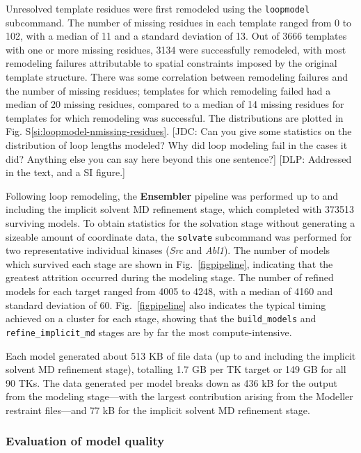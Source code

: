 \documentclass[aps,pre,twocolumn,nofootinbib,superscriptaddress,linenumbers]{revtex4-1}
\begin{document}
Unresolved template residues were first remodeled using the {\tt loopmodel} subcommand.
The number of missing residues in each template ranged from 0 to 102, with a median of 11 and a standard deviation of 13.
Out of 3666 templates with one or more missing residues, 3134 were successfully remodeled, with most remodeling failures attributable to spatial constraints imposed by the original template structure.
There was some correlation between remodeling failures and the number of missing residues; templates for which remodeling failed had a median of 20 missing residues, compared to a median of 14 missing residues for templates for which remodeling was successful.
The distributions are plotted in Fig. S\ref{si:loopmodel-nmissing-residues}.
{\color{red}[JDC: Can you give some statistics on the distribution of loop lengths modeled?  Why did loop modeling fail in the cases it did?  Anything else you can say here beyond this one sentence?]}
{\color{blue}[DLP: Addressed in the text, and a SI figure.]}

Following loop remodeling, the {\bf Ensembler} pipeline was performed up to and including the implicit solvent MD refinement stage, which completed with \num{373513} surviving models.
To obtain statistics for the solvation stage without generating a sizeable amount of coordinate data, the {\tt solvate} subcommand was performed for two representative individual kinases (\emph{Src} and \emph{Abl1}).
The number of models which survived each stage are shown in Fig.~\ref{figpipeline}, indicating that the greatest attrition occurred during the modeling stage.
The number of refined models for each target ranged from 4005 to 4248, with a median of 4160 and standard deviation of 60.
Fig.~\ref{figpipeline} also indicates the typical timing achieved on a cluster for each stage, showing that the {\tt build\_models} and {\tt refine\_implicit\_md} stages are by far the most compute-intensive.

Each model generated about 513 KB of file data (up to and including the implicit solvent MD refinement stage), totalling 1.7 GB per TK target or 149 GB for all 90 TKs.
The data generated per model breaks down as 436 kB for the output from the modeling stage---with the largest contribution arising from the Modeller restraint files---and 77 kB for the implicit solvent MD refinement stage.

\subsubsection*{Evaluation of model quality}
\end{document}
